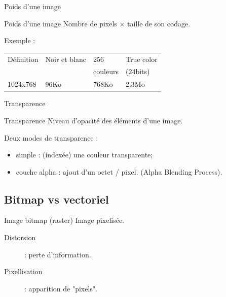 \documentclass[14pt]{beamer}
\begin{document}
\begin{frame}{Poids d'une image}
    \begin{block}{Poids d'une image}
    Nombre de pixels $\times$ taille de son codage.
    \end{block}
    Exemple :
    \begin{tabular}{|l|l|l|l|}
      \hline
      Définition  & Noir et blanc & 256  & True color \\ 
      & & couleurs & (24bits) \\
      \hline
      1024x768 & 96Ko & 768Ko & 2.3Mo \\
      \hline
    \end{tabular}
\end{frame}


\begin{frame}{Transparence}
    \begin{block}{Transparence}
    Niveau d'opacité des éléments d'une image.\\
    \end{block}
    \vfill
    Deux modes de transparence : 
    \begin{itemize}
    \item simple : (indexée) une couleur transparente;
    \item couche alpha : ajout d'un octet / pixel. (Alpha Blending Process).
    \end{itemize}
\end{frame}


\subsection{Bitmap vs vectoriel}
\begin{frame}{\subsecname}
    \begin{block}{Image bitmap (raster)}
        Image pixelisée.
    \end{block}
    \vfill

    \begin{description}
    \item[Distorsion] : perte d'information.
    \item[Pixellisation] : apparition de "pixels".
    \end{description}
\end{frame}
\end{document}
